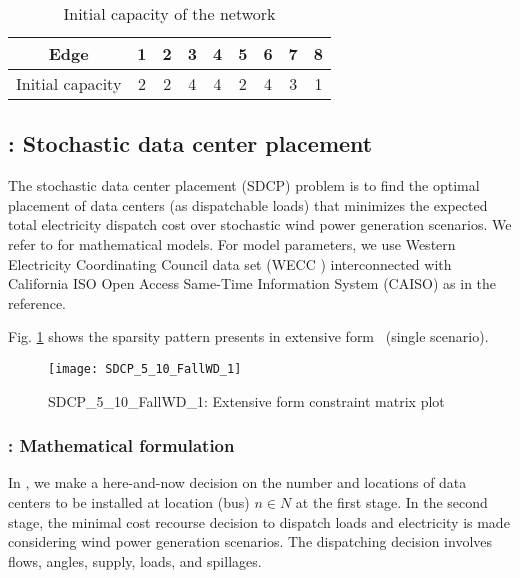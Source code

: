 \begin{table}[H]
	\centering
	\caption{Initial capacity of the network \cite{journal:AF2004}} 
	\begin{tabular}{|c|c|c|c|c|c|c|c|c|}
		\hline
		Edge             & 1 & 2 & 3 & 4 & 5 & 6 & 7 & 8 \\ \hline
		Initial capacity & 2 & 2 & 4 & 4 & 2 & 4 & 3 & 1 \\ \hline
	\end{tabular}
	\label{table:phone_network}
\end{table}

\subsection{\sdcp: Stochastic data center placement} \label{SDCP}
The stochastic data center placement (SDCP) problem is to find the optimal placement of data centers (as dispatchable loads) that minimizes the expected total electricity dispatch cost over stochastic wind power generation scenarios. We refer to \cite{journal:KYZC2017} for mathematical models. For model parameters, we use Western Electricity Coordinating Council data set (WECC \cite{web:wecc}) interconnected with California ISO Open Access Same-Time Information System (CAISO) as in the reference. 

Fig. \ref{fig:sdcp_sparsity} shows the sparsity pattern presents in extensive form \sdcp\ (single scenario).
\begin{figure}[H]
	\centering
	\texttt{[image: SDCP\_5\_10\_FallWD\_1]}
	\caption{SDCP\_5\_10\_FallWD\_1: Extensive form constraint matrix plot}
	\label{fig:sdcp_sparsity}
\end{figure}

\subsubsection{\sdcp: Mathematical formulation}
In \sdcp, we make a here-and-now decision on the number and locations of data centers to be installed at location (bus) $n\in N$ at the first stage. In the second stage, the minimal cost recourse decision to dispatch loads and electricity is made considering wind power generation scenarios. The dispatching decision involves flows, angles, supply, loads, and spillages.

